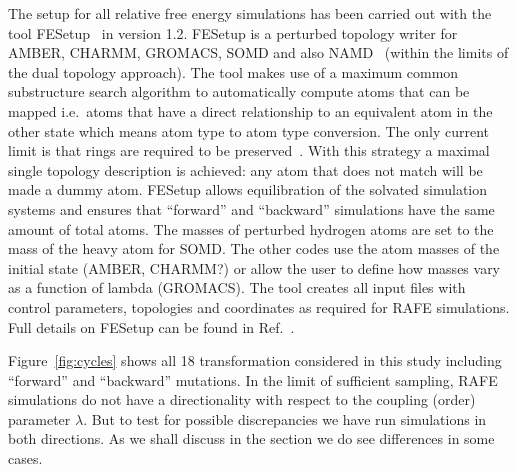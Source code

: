 \documentclass[journal=jctcce,manuscript=article]{achemso}
\begin{document}
The setup for all relative free energy simulations has been carried
out with the tool FESetup~\cite{loeffler_fesetup:_2015} in version
1.2.  FESetup is a perturbed topology writer for AMBER, CHARMM,
GROMACS, SOMD and also NAMD~\cite{JCC:JCC20289} (within the
limits of the dual topology approach).  The tool makes use of a
maximum common substructure search algorithm to automatically compute
atoms that can be mapped i.e.\ atoms that have a direct relationship
to an equivalent atom in the other state which means atom type to
atom type conversion.  The only current limit is that rings are
required to be preserved~\cite{doi:10.1021/acs.jcim.5b00057}.  With this
strategy a maximal single topology description is achieved: any atom that
does not match will be made a dummy atom.  FESetup allows
equilibration of the solvated simulation systems and ensures that
``forward'' and ``backward'' simulations have the same amount of
total atoms.  The masses of perturbed hydrogen atoms are set to the mass of the heavy atom for SOMD.  The other codes use the atom masses of the initial state (AMBER, CHARMM?) or allow the user to define how masses vary as a function of lambda (GROMACS).
The tool creates all input files with control
parameters, topologies and coordinates as required for RAFE
simulations.  Full details on FESetup can be found in
Ref.~.

Figure~\ref{fig:cycles} shows all 18 transformation considered in this
study including ``forward'' and ``backward'' mutations.  In the limit of sufficient sampling, RAFE simulations do not have a directionality with respect to the coupling (order) parameter $\lambda$. But to test for possible discrepancies we have run 
simulations in both directions.  As we shall discuss in the 
 section we do see differences in some cases.
\end{document}
